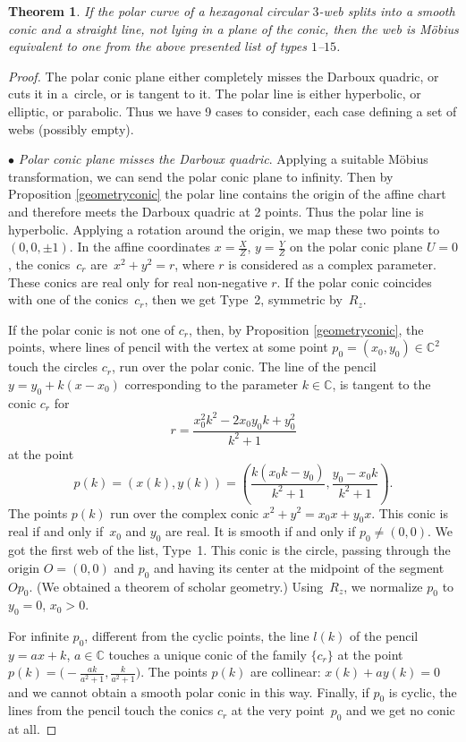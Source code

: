 \documentclass[11pt]{article}
\numberwithin{equation}{section}
\numberwithin{equation}{section}
\newtheorem{Theorem}{Theorem}[section]
\begin{document}
\begin{Theorem}\label{conicPencil}
If the polar curve of a hexagonal circular $3$-web splits into a smooth conic and a straight line, not lying in a plane of the conic, then the web is M\"obius equivalent to one from the above presented list of types $1$--$15$.
\end{Theorem}
\begin{proof} The polar conic plane either completely misses the Darboux quadric, or cuts it in a~circle, or is tangent to it. The polar line is either hyperbolic, or elliptic, or parabolic. Thus we have 9 cases to consider, each case defining a set of webs (possibly empty).

$\bullet$ {\it Polar conic plane misses the Darboux quadric}.
Applying a suitable M\" obius transformation, we can send the polar conic plane to infinity. Then by Proposition \ref{geometryconic} the polar line contains the origin of the affine chart and therefore meets the Darboux quadric at 2 points. Thus the polar line is hyperbolic. Applying a rotation around the origin, we map these two points to~${(0,0,\pm 1)}$. In the affine coordinates $x=\frac{X}{Z}$, $ y=\frac{Y}{Z}$ on the polar conic plane $U=0$, the conics~$c_r$ are~${
x^2+y^2=r}$,
where $r$ is considered as a complex parameter. These conics are real only for real non-negative $r$.
If the polar conic coincides with one of the conics~$c_r$, then we get Type~2, symmetric by~$R_z$.

If the polar conic is not one of $c_r$, then, by Proposition \ref{geometryconic}, the points, where lines of pencil with the vertex at some point $p_0=(x_0,y_0)\in \mathbb C^2$ touch the circles $c_r$, run over the polar conic. The line of the pencil $y=y_0+k(x-x_0)$ corresponding to the parameter $k\in \mathbb C$, is tangent to the conic $c_r$ for
\[
r=\frac{x_0^2k^2 - 2x_0y_0k + y_0^2}{k^2 + 1}
\]
at the point
\[
p(k)=(x(k),y(k))=\left(\frac{k(x_0k - y_0)}{k^2 + 1},\frac{y_0-x_0k}{k^2 + 1} \right).
\]
The points $p(k)$ run over the complex conic
$
x^2+y^2 =x_0x + y_0x$.
 This conic is real if and only if~$x_0$ and $y_0$ are real. It is smooth if and only if $p_0\ne (0,0)$. We got the first web of the list, Type~1. This conic is the circle, passing through the origin $O=(0,0)$ and $p_0$ and having its center at the midpoint of the segment $Op_0$.
(We obtained a theorem of scholar geometry.) Using~$R_z$, we normalize $p_0$ to $y_0=0$, $x_0>0$.

 For infinite $p_0$, different from the cyclic points, the line $l(k)$ of the pencil $y=ax+k$, $a\in \mathbb C$ touches a unique conic of the family $\{c_r\}$ at the point
$
p(k)=\bigl(-\frac{ak}{a^2 + 1}, \frac{k}{a^2 + 1}\bigr)$.
The points $p(k)$ are collinear: $x(k)+ay(k)=0$ and we cannot obtain a smooth polar conic in this way. Finally, if $p_0$ is cyclic, the lines from the pencil touch the conics $c_r$ at the very point~$p_0$ and we get no conic at all.



\end{proof}
\end{document}
